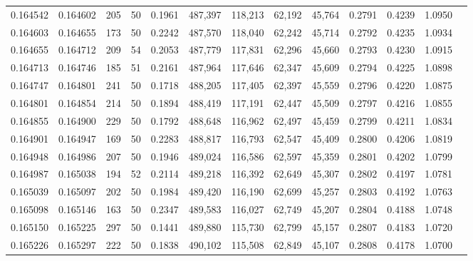 \begin{tabular}{rrrrrrrrrrrrr}
0.164542 & 0.164602 &   205 &  50 &                                     0.1961 & 487,397 & 118,213 &  62,192 &  45,764 & 0.2791 & 0.4239 & 1.0950 \\
0.164603 & 0.164655 &   173 &  50 &                                     0.2242 & 487,570 & 118,040 &  62,242 &  45,714 & 0.2792 & 0.4235 & 1.0934 \\
0.164655 & 0.164712 &   209 &  54 &                                     0.2053 & 487,779 & 117,831 &  62,296 &  45,660 & 0.2793 & 0.4230 & 1.0915 \\
0.164713 & 0.164746 &   185 &  51 &                                     0.2161 & 487,964 & 117,646 &  62,347 &  45,609 & 0.2794 & 0.4225 & 1.0898 \\
0.164747 & 0.164801 &   241 &  50 &                                     0.1718 & 488,205 & 117,405 &  62,397 &  45,559 & 0.2796 & 0.4220 & 1.0875 \\
0.164801 & 0.164854 &   214 &  50 &                                     0.1894 & 488,419 & 117,191 &  62,447 &  45,509 & 0.2797 & 0.4216 & 1.0855 \\
0.164855 & 0.164900 &   229 &  50 &                                     0.1792 & 488,648 & 116,962 &  62,497 &  45,459 & 0.2799 & 0.4211 & 1.0834 \\
0.164901 & 0.164947 &   169 &  50 &                                     0.2283 & 488,817 & 116,793 &  62,547 &  45,409 & 0.2800 & 0.4206 & 1.0819 \\
0.164948 & 0.164986 &   207 &  50 &                                     0.1946 & 489,024 & 116,586 &  62,597 &  45,359 & 0.2801 & 0.4202 & 1.0799 \\
0.164987 & 0.165038 &   194 &  52 &                                     0.2114 & 489,218 & 116,392 &  62,649 &  45,307 & 0.2802 & 0.4197 & 1.0781 \\
0.165039 & 0.165097 &   202 &  50 &                                     0.1984 & 489,420 & 116,190 &  62,699 &  45,257 & 0.2803 & 0.4192 & 1.0763 \\
0.165098 & 0.165146 &   163 &  50 &                                     0.2347 & 489,583 & 116,027 &  62,749 &  45,207 & 0.2804 & 0.4188 & 1.0748 \\
0.165150 & 0.165225 &   297 &  50 &                                     0.1441 & 489,880 & 115,730 &  62,799 &  45,157 & 0.2807 & 0.4183 & 1.0720 \\
0.165226 & 0.165297 &   222 &  50 &                                     0.1838 & 490,102 & 115,508 &  62,849 &  45,107 & 0.2808 & 0.4178 & 1.0700 \\

\end{tabular}
